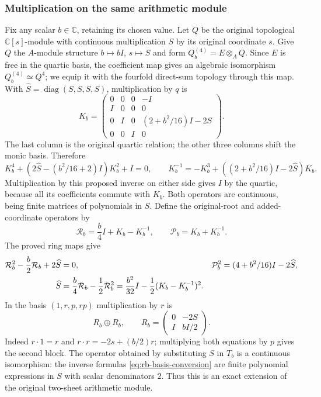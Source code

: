 \subsubsection{Multiplication on the same arithmetic module}
Fix any scalar $b\in\mathbb C$, retaining its chosen value.
Let $Q$ be the original topological $\mathbb C[s]$-module with
continuous multiplication $S$ by its original coordinate $s$.
Give $Q$ the $A$-module structure $b\mapsto bI$, $s\mapsto S$ and
form $Q_b^{(4)}=E\otimes_AQ$. Since $E$ is free in the quartic basis,
the coefficient map gives an algebraic isomorphism $Q_b^{(4)}\simeq Q^4$;
we equip it with the fourfold direct-sum topology through this map.
With $\widehat S=\operatorname{diag}(S,S,S,S)$, multiplication by $q$ is
\begin{equation}\label{eq:rb-K}
 K_b=\begin{pmatrix}
 0&0&0&-I\\
 I&0&0&0\\
 0&I&0&(2+b^2/16)I-2S\\
 0&0&I&0
 \end{pmatrix}.
\end{equation}
The last column is the original quartic relation; the other three
columns shift the monic basis. Therefore
\[
 K_b^4+(2\widehat S-(b^2/16+2)I)K_b^2+I=0,\qquad
 K_b^{-1}=-K_b^3+((2+b^2/16)I-2\widehat S)K_b.
\]
Multiplication by this proposed inverse on either side gives $I$
by the quartic, because all its coefficients commute with $K_b$.
Both operators are continuous, being finite matrices of polynomials
in $S$. Define the original-root and added-coordinate operators by
\[
 \mathcal R_b=\frac b4I+K_b-K_b^{-1},\qquad
 \mathcal P_b=K_b+K_b^{-1}.
\]
The proved ring maps give
\begin{align}
 \mathcal R_b^2-\frac b2\mathcal R_b+2\widehat S&=0,&
 \mathcal P_b^2&=(4+b^2/16)I-2\widehat S,\notag\\
 \widehat S&=\frac b4\mathcal R_b-\frac12\mathcal R_b^2
 =\frac{b^2}{32}I-\frac12(K_b-K_b^{-1})^2.
 \label{eq:rb-original-S}
\end{align}
In the basis $(1,r,p,rp)$ multiplication by $r$ is
\[
 R_b\oplus R_b,\qquad
 R_b=\begin{pmatrix}0&-2S\\I&bI/2\end{pmatrix}.
\]
Indeed $r\cdot1=r$ and $r\cdot r=-2s+(b/2)r$; multiplying both
equations by $p$ gives the second block. The operator obtained by
substituting $S$ in $T_b$ is a continuous isomorphism: the inverse
formulas \eqref{eq:rb-basis-conversion} are finite polynomial
expressions in $S$ with scalar denominators $2$. Thus this is an
exact extension of the original two-sheet arithmetic module.

